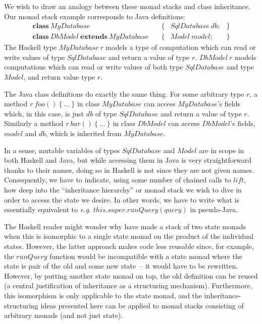 We wish to draw an analogy between these monad stacks and class inheritance.
Our monad stack example corresponds to Java definitions:
\begin{displaymath}
\begin{array}{lclc}
\mathbf{class}~\mathit{MyDatabase} & \quad \{ & \mathit{SqlDatabase}~\mathit{db}; & \} \\
\mathbf{class}~\mathit{DbModel}~\mathbf{extends}~\mathit{MyDatabase} & \quad \{ & \mathit{Model}~\mathit{model}; & \}
\end{array}
\end{displaymath}
The Haskell type $\mathit{MyDatabase}~r$ models a type of computation which can read or write values of type $\mathit{SqlDatabase}$ and return a value of type $r$. $\mathit{DbModel}~r$ models computations which can read or write values of both type $\mathit{SqlDatabase}$ and type $\mathit{Model}$, and return value type $r$.

The Java class definitions do exactly the same thing. For some arbitrary type $r$, a method $r~\mathit{foo}()~\{~\ldots~\}$ in class $\mathit{MyDatabase}$ can access $\mathit{MyDatabase}$'s fields which, in this case, is just $\mathit{db}$ of type $\mathit{SqlDatabase}$ and return a value of type $r$.  Similarly a method $r~\mathit{bar}()~\{~\ldots~\}$ in class $\mathit{DbModel}$ can access $\mathit{DbModel}$'s fields, $\mathit{model}$ and $\mathit{db}$, which is inherited from $\mathit{MyDatabase}$. 

In a sense, mutable variables of types $\mathit{SqlDatabase}$ and $\mathit{Model}$ are in scope in both Haskell and Java, but while accessing them in Java is very straightforward thanks to their names, doing so in Haskell is not since they are not given names. Consequently, we have to indicate, using some number of chained calls to $\mathit{lift}$, how deep into the ``inheritance hierarchy'' or monad stack we wish to dive in order to access the state we desire. In other words, we have to write what is essentially equivalent to \emph{e.g.} $\mathit{this}.\mathit{super}.\mathit{runQuery}(\mathit{query})$ in pseudo-Java. 

The Haskell reader might wonder why have made a stack of two state monads
when this is isomorphic to a single state monad on the product of the
individual states.
However, the latter approach makes code less reusable since, for example, the $\mathit{runQuery}$ function would be incompatible with a state monad where the state is pair of the old and some new state~-- it would have to be rewritten. However, by putting another state monad on top, the old definition can be reused
(a central justification of inheritance as a structuring mechanism).
Furthermore, this isomorphism is only applicable to the state monad, and
the inheritance-structuring ideas presented here can be applied to monad stacks consisting of arbitrary monads (and not just state).

